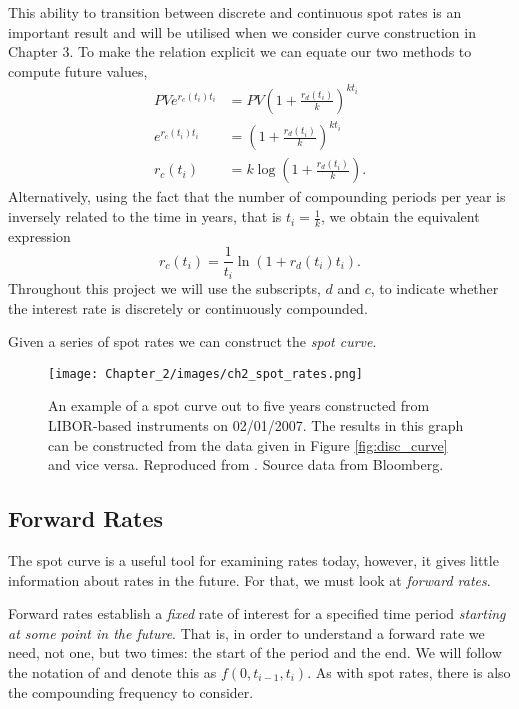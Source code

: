 This ability to transition between discrete and continuous spot rates is an important result and will be utilised when we consider curve construction in Chapter 3. To make the relation explicit we can equate our two methods to compute future values,
\begin{align}
    PV e^{r_c(t_i) t_i} &= PV \left(1 + \frac{r_d(t_i)}{k} \right)^{k t_i} \\
    e^{r_c(t_i) t_i} &= \left(1 + \frac{r_d(t_i)}{k} \right)^{k t_i} \\
    r_c(t_i) &= k \log \left(1 + \frac{r_d(t_i)}{k} \right).
\end{align}
Alternatively, using the fact that the number of compounding periods per year is inversely related to the time in years, that is $t_i = \frac{1}{k}$, we obtain the equivalent expression \citep{banque_canada}
\begin{equation}
    r_c(t_i) = \frac{1}{t_i} \ln ( 1 + r_d(t_i) t_i).
\end{equation}
Throughout this project we will use the subscripts, $d$ and $c$, to indicate whether the interest rate is discretely or continuously compounded.

Given a series of spot rates we can construct the \textit{spot curve}. 

\vspace{0.75cm}

\begin{figure}[ht]
\begin{center}
\texttt{[image: Chapter\_2/images/ch2\_spot\_rates.png]}
\caption[LIBOR-based Spot Curve on 02/01/2007]{An example of a spot curve out to five years constructed from LIBOR-based instruments on 02/01/2007. The results in this graph can be constructed from the data given in Figure \ref{fig:disc_curve} and vice versa. Reproduced from \cite{veronesi2016handbook}. Source data from Bloomberg.}
\label{fig:spot_curve}
\end{center}
\end{figure}

\subsection{Forward Rates}

The spot curve is a useful tool for examining rates today, however, it gives little information about rates in the future. For that, we must look at \textit{forward rates}.

Forward rates establish a \textit{fixed} rate of interest for a specified time period \textit{starting at some point in the future}. That is, in order to understand a forward rate we need, not one, but two times: the start of the period and the end. We will follow the notation of \cite{veronesi2016handbook} and denote this as $f(0,t_{i-1}, t_i)$. As with spot rates, there is also the compounding frequency to consider.

